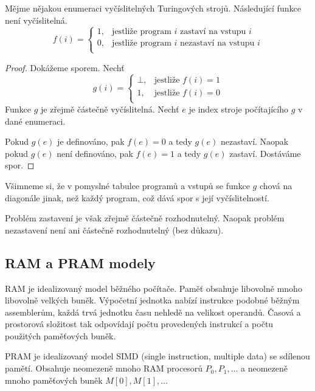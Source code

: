 \begin{theorem}
Mějme nějakou enumeraci vyčíslitelných Turingových strojů.
Následující funkce není vyčíslitelná.
\[
    f(i) =
    \begin{cases}
        1, & \text{jestliže program } i \text { zastaví na vstupu } i \\
        0, & \text{jestliže program } i \text { nezastaví na vstupu } i \\
    \end{cases}
\]
\end{theorem}

\begin{proof}
Dokážeme sporem. Nechť
\[
    g(i) =
    \begin{cases}
        \bot, & \text{jestliže } f(i) = 1 \\
        1, & \text{jestliže } f(i) = 0 \\
    \end{cases}
\]
Funkce $g$ je zřejmě částečně vyčíslitelná. Nechť $e$ je index stroje
počítajícího $g$ v dané enumeraci.

Pokud $g(e)$ je definováno, pak $f(e) = 0$ a tedy $g(e)$ nezastaví. Naopak
pokud $g(e)$ není definováno, pak $f(e) = 1$ a tedy $g(e)$ zastaví.
Dostáváme spor.
\end{proof}

Všimneme si, že v pomyslné tabulce programů a vstupů se funkce $g$ chová
na diagonále jinak, než každý program, což dává spor s její
vyčíslitelností.

Problém zastavení je však zřejmě částečně rozhodnutelný.
Naopak problém nezastavení není ani částečně rozhodnutelný (bez důkazu).

\subsection{RAM a PRAM modely}


RAM je idealizovaný model běžného počítače. Paměť obsahuje libovolně
mnoho libovolně velkých buněk. Výpočetní jednotka nabízí
instrukce podobné běžným assemblerům, každá trvá jednotku času nehledě
na velikost operandů. Časová a prostorová složitost tak odpovídají počtu
provedených instrukcí a počtu použitých paměťových buněk.

PRAM je idealizovaný model SIMD (single instruction, multiple data) se
sdílenou pamětí. Obsahuje
neomezeně mnoho RAM procesorů $P_0, P_1,\ldots$
a neomezeně mnoho paměťových buněk $M[0], M[1],\ldots$

